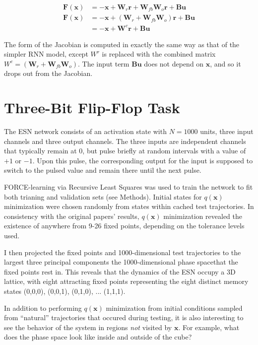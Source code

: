 \documentclass{article} %
\newcommand{\bf}[1]{\mathbf{#1}}
\newcommand{\x}{\bf{x}}
\begin{document}
\begin{align}
  \bf{F}(\x) &= -\x + \bf{W}_{r}\bf{r}+\bf{W}_{fb}{\bf{W}_o \bf{r}}+\bf{B}\bf{u} \\
  \bf{F}(\x) &= -\x + (\bf{W}_{r}+\bf{W}_{fb}\bf{W}_o)\bf{r}+\bf{B}\bf{u} \\
  &= -\x + \bf{W}^c\bf{r}+\bf{B}\bf{u}
\end{align}

The form of the Jacobian is computed in exactly the same way as that of the simpler RNN model, except $W^r$ is replaced with the combined matrix $W^c = (\bf{W}_{r}+\bf{W}_{fb}\bf{W}_o)$. The input term $\bf{B}\bf{u}$ does not depend on $\x$, and so it drops out from the Jacobian.

\section{Three-Bit Flip-Flop Task}

The ESN network consists of an activation state with $N=1000$ units, three input channels and three output channels. The three inputs are independent channels that typically remain at $0$, but pulse briefly at random intervals with a value of $+1$ or $-1$. Upon this pulse, the corresponding output for the input is supposed to switch to the pulsed value and remain there until the next pulse.

FORCE-learning via Recursive Least Squares was used to train the network to fit both trianing and validation sets (see Methods). Initial states for $q(\x)$ minimization were chosen randomly from states within cached test trajectories. In consistency with the original papers' results, $q(\x)$ minimization revealed the existence of anywhere from 9-26 fixed points, depending on the tolerance levels used.

I then projected the fixed points and 1000-dimensional test trajectories to the largest three principal components the 1000-dimensional phase spacethat the fixed points rest in. This reveals that the dynamics of the ESN occupy a 3D lattice, with eight attracting fixed points representing the eight distinct memory states (0,0,0), (0,0,1), (0,1,0), ... (1,1,1).

In addition to performing $q(\x)$ minimization from initial conditions sampled from ``natural'' trajectories that occured during testing, it is also interesting to see the behavior of the system in regions \textit{not} visited by $\x$. For example, what does the phase space look like inside and outside of the cube?
\end{document}
